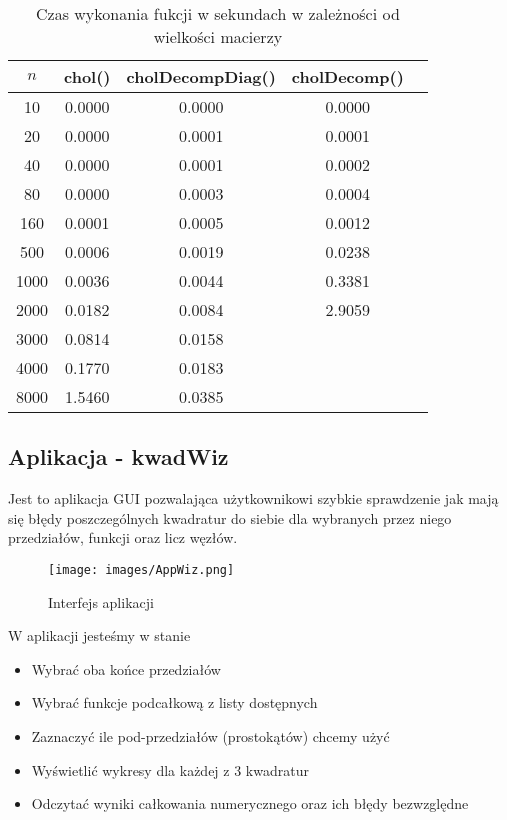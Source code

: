 \documentclass[12pt]{article}
\begin{document}
\begin{table}[h!]
\caption{\footnotesize  Czas wykonania fukcji w sekundach w zależności od wielkości macierzy } %
\renewcommand{\arraystretch}{1.1}
\centering\begin{tabular}{|c|c|c|c|c|}
\hline $n$ & chol() & cholDecompDiag() & cholDecomp() \\
\hline     10 & 0.0000 & 0.0000 & 0.0000 \\
\hline     20 & 0.0000 & 0.0001 & 0.0001 \\
\hline     40 & 0.0000 & 0.0001 & 0.0002 \\
\hline     80 & 0.0000 & 0.0003 & 0.0004 \\
\hline    160 & 0.0001 & 0.0005 & 0.0012 \\
\hline    500 & 0.0006 & 0.0019 & 0.0238 \\
\hline   1000 & 0.0036 & 0.0044 & 0.3381 \\
\hline   2000 & 0.0182 & 0.0084 & 2.9059 \\
\hline   3000 & 0.0814 & 0.0158 &  \\
\hline   4000 & 0.1770 & 0.0183 &  \\
\hline   8000 & 1.5460 & 0.0385 &  \\
\hline
\end{tabular}
\label{Tabela z wynikami 1}
\end{table}

\subsection{Aplikacja - kwadWiz}

Jest to aplikacja GUI pozwalająca użytkownikowi szybkie sprawdzenie jak mają się błędy poszczególnych kwadratur do siebie dla wybranych przez niego przedziałów, funkcji oraz licz węzłów.

\begin{figure}[!h]
    \centering
    \texttt{[image: images/AppWiz.png]}
    \caption{Interfejs aplikacji}
    \label{fig:my_label}
\end{figure}

W aplikacji jesteśmy w stanie

\begin{itemize}
    \item Wybrać oba końce przedziałów
    \item Wybrać funkcje podcałkową z listy dostępnych
    \item Zaznaczyć ile pod-przedziałów (prostokątów) chcemy użyć
    \item Wyświetlić wykresy dla każdej z 3 kwadratur
    \item Odczytać wyniki całkowania numerycznego oraz ich błędy bezwzględne
\end{itemize}
\end{document}
